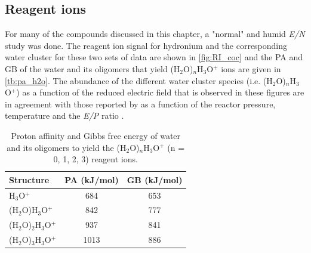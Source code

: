 \subsection{Reagent ions}\label{section:coc_RI}
For many of the compounds discussed in this chapter, a "normal" and humid \textit{E/N} study was done.
%
The reagent ion signal for hydronium and the corresponding water cluster for these two sets of data are shown in \autoref{fig:RI_coc} and the PA and GB of  the water and its oligomers that yield (H$_2$O)$_n$H$_3$O$^+$ ions are given in \autoref{tb:pa_h2o}.
%
The abundance of the different water cluster species (i.e. (H$_2$O)$_n$H$_3$O$^+$) as a function of the reduced electric field that is observed in these figures are in agreement with those reported by \citeauthor{price1977new} as a function of the  reactor pressure, temperature and the \textit{E/P} ratio \cite{price1977new}.



\begin{table}[htbp]
\centering
\caption{Proton affinity and Gibbs free energy of water and its oligomers to yield the (H$_2$O)$_n$H$_3$O$^+$ (n = 0, 1, 2, 3) reagent ions.}
\label{tb:pa_h2o}
\begin{tabular}{lcc}
\toprule
\textbf{Structure} &\textbf{PA (kJ/mol)} &\textbf{GB (kJ/mol)}\\ \toprule
H$_3$O$^+$              &684  &653       \\
(H$_2$O)H$_3$O$^+$      &842  &777       \\
(H$_2$O)$_2$H$_3$O$^+$  &937  &841       \\
(H$_2$O)$_3$H$_3$O$^+$  &1013  &886       \\
\bottomrule
\end{tabular}
\end{table}

